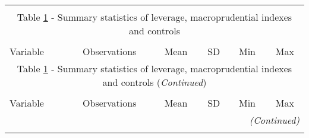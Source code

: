 \begin{longtable}{lccccc}\\
	\label{tab:number of firms}\\
	\multicolumn{6}{c}{Table \ref{tab:number of firms} - Summary statistics of leverage, macroprudential indexes and controls}\\ \hline \hline\\
                                                           
 Variable   &   Observations &    Mean &          SD&         Min&         Max\\

\hline \endfirsthead

	\multicolumn{6}{c}{Table \ref{tab:number of firms} - Summary statistics of leverage, macroprudential indexes and controls (\textit{Continued})}\\ \hline \hline\\

Variable   &   Observations &    Mean &          SD&         Min&         Max\\

\hline \endhead
\hline
\multicolumn{6}{r}{{\textit{(Continued)}}}\\ \endfoot

\endlastfoot


\end{longtable}

